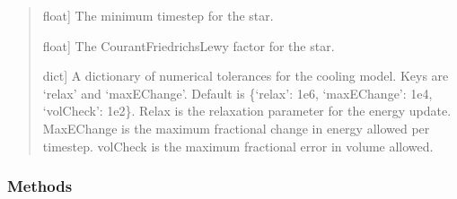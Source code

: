 \documentclass[letterpaper,10pt,english]{sphinxmanual}
\begin{document}
\begin{fulllineitems}
\begin{quote}
\begin{description}
\begin{description}
\sphinxlineitem{\sphinxstylestrong{mindt}}{[}float{]}
\sphinxAtStartPar
The minimum timestep for the star.

\sphinxlineitem{\sphinxstylestrong{cfl\_factor}}{[}float{]}
\sphinxAtStartPar
The Courant\sphinxhyphen{}Friedrichs\sphinxhyphen{}Lewy factor for the star.

\sphinxlineitem{\sphinxstylestrong{tol}}{[}dict{]}
\sphinxAtStartPar
A dictionary of numerical tolerances for the cooling model.
Keys are ‘relax’ and ‘maxEChange’. Default is \{‘relax’: 1e\sphinxhyphen{}6, ‘maxEChange’: 1e\sphinxhyphen{}4, ‘volCheck’: 1e\sphinxhyphen{}2\}.
Relax is the relaxation parameter for the energy update. 
MaxEChange is the maximum fractional change in energy allowed per timestep.
volCheck is the maximum fractional error in volume allowed.

\end{description}

\end{description}\end{quote}
\subsubsection*{Methods}



\end{fulllineitems}
\end{document}
